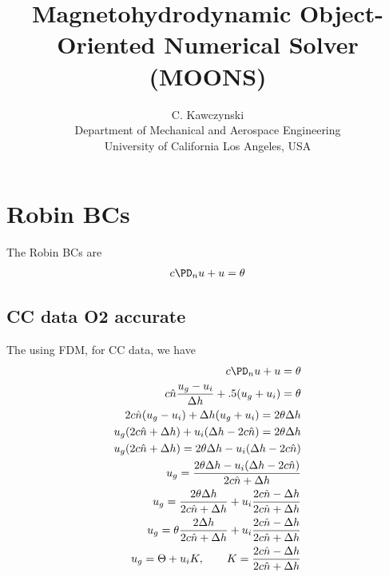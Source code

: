\documentclass[11pt]{article}
\begin{document}
\doublespacing
\title{Magnetohydrodynamic Object-Oriented Numerical Solver (MOONS)}
\author{C. Kawczynski \\
Department of Mechanical and Aerospace Engineering \\
University of California Los Angeles, USA\\
}
\maketitle

\section{Robin BCs}
The Robin BCs are
\begin{equation}\begin{aligned}
  c \PD_n u + u = \theta \\
\end{aligned}\end{equation}
\subsection{CC data O2 accurate}
The using FDM, for CC data, we have
\begin{equation}\begin{aligned}
  c \PD_n u + u = \theta \\
  c \hat{n} \frac{u_g - u_i}{\Delta h} + .5 (u_g+u_i) = \theta \\
  2 c \hat{n} (u_g - u_i) + \Delta h (u_g+u_i) = 2 \theta \Delta h \\
  u_g (2 c \hat{n} + \Delta h) + u_i (\Delta h - 2c \hat{n}) = 2 \theta \Delta h \\
  u_g (2 c \hat{n} + \Delta h) = 2 \theta \Delta h - u_i (\Delta h - 2c \hat{n}) \\
  u_g = \frac{2 \theta \Delta h - u_i (\Delta h - 2c \hat{n})}{2 c \hat{n} + \Delta h} \\
  u_g = \frac{2 \theta \Delta h}{2 c \hat{n} + \Delta h} + u_i \frac{2c \hat{n} - \Delta h}{2 c \hat{n} + \Delta h} \\
  u_g = \theta \frac{2 \Delta h}{2 c \hat{n} + \Delta h} + u_i \frac{2c \hat{n} - \Delta h}{2 c \hat{n} + \Delta h} \\
  u_g = \Theta + u_i K, \qquad K = \frac{2c \hat{n} - \Delta h}{2 c \hat{n} + \Delta h} \\
\end{aligned}\end{equation}
\end{document}
